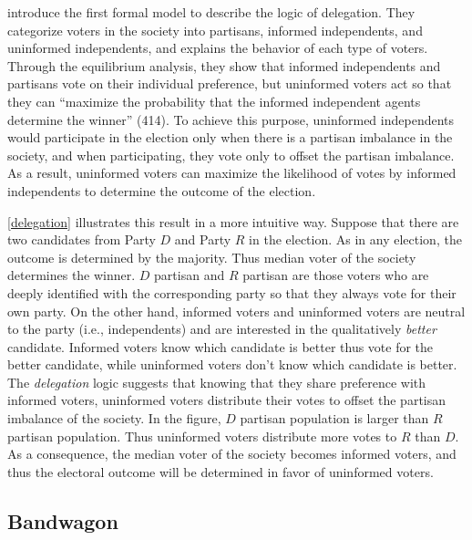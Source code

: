 \documentclass[doc,natbib,12pt]{apa6}\usepackage[]{graphicx}\usepackage[]{color}
\begin{document}
    \par \cite{Feddersen1996thsw} introduce the first formal model to describe the logic of delegation. They categorize voters in the society into partisans, informed independents, and uninformed independents, and explains the behavior of each type of voters. Through the equilibrium analysis, they show that informed independents and partisans vote on their individual preference, but uninformed voters act so that they can ``maximize the probability that the informed independent agents determine the winner'' (414). To achieve this purpose, uninformed independents would participate in the election only when there is a partisan imbalance in the society, and when participating, they vote only to offset the partisan imbalance. As a result, uninformed voters can maximize the likelihood of votes by informed independents to determine the outcome of the election. 
    
    \par \autoref{delegation} illustrates this result in a more intuitive way. Suppose that there are two candidates from Party $D$ and Party $R$ in the election. As in any election, the outcome is determined by the majority. Thus median voter of the society determines the winner. $D$ partisan and $R$ partisan are those voters who are deeply identified with the corresponding party so that they always vote for their own party. On the other hand, informed voters and uninformed voters are neutral to the party (i.e., independents) and are interested in the qualitatively \textit{better} candidate. Informed voters know which candidate is better thus vote for the better candidate, while uninformed voters don't know which candidate is better. The \textit{delegation} logic suggests that knowing that they share preference with informed voters, uninformed voters distribute their votes to offset the partisan imbalance of the society. In the figure, $D$ partisan population is larger than $R$ partisan population. Thus uninformed voters distribute more votes to $R$ than $D$. As a consequence, the median voter of the society becomes informed voters, and thus the electoral outcome will be determined in favor of uninformed voters.  
    
    \subsection{Bandwagon}
    
\end{document}
